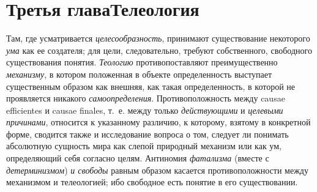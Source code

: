 \chapter[Третья глава Телеология]{Третья глава\newline Телеология}
Там, где усматривается
{\em целесообразность},
принимают существование некоторого
{\em ума} как ее
создателя; для цели, следовательно, требуют собственного, свободного
существования понятия. {\em Теологию}
противопоставляют преимущественно
{\em механизму}, в
котором положенная в объекте определенность выступает существенным образом
как внешняя, как такая определенность, в которой не проявляется никакого
{\em самоопределения}.
Противоположность между causae efficientes и
causae finales, т.~е. между только
{\em действующими} и
{\em целевыми причинами},
относится к указанному различию, к которому, взятому в
конкретной форме, сводится также и исследование вопроса о том, следует ли
понимать абсолютную сущность мира как слепой природный механизм или как ум,
определяющий себя согласно целям. Антиномия
{\em фатализма} (вместе с
{\em детерминизмом})
{\em и свободы} равным
образом касается противоположности между механизмом и телеологией; ибо
свободное есть понятие в его существовании.

